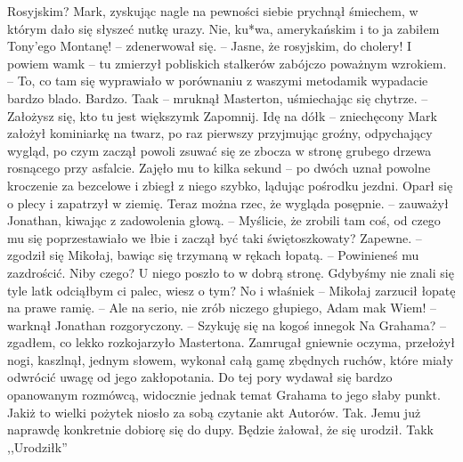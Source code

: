 \documentclass[../MAIN.tex]{subfiles}
\begin{document}
\sx Rosyjskim?
\qd
Mark, zyskując nagle na pewności siebie prychnął śmiechem, w którym dało się słyszeć nutkę urazy.
\sx Nie, ku*wa, amerykańskim i to ja zabiłem Tony’ego Montanę! -- zdenerwował się. -- Jasne, że rosyjskim, do cholery! I powiem wam\3k -- tu zmierzył pobliskich stalkerów zabójczo poważnym wzrokiem. -- To, co tam się wyprawiało w porównaniu z waszymi metodami\3k wypadacie bardzo blado. Bardzo.
\xx Taa\3k -- mruknął Masterton, uśmiechając się chytrze. -- Założysz się, kto tu jest większym\3k
\xx Zapomnij. Idę na dół\3k -- zniechęcony Mark założył kominiarkę na twarz, po raz pierwszy przyjmując groźny, odpychający wygląd, po czym zaczął powoli zsuwać się ze zbocza w stronę grubego drzewa rosnącego przy asfalcie.
\qd
Zajęło mu to kilka sekund -- po dwóch uznał powolne kroczenie za bezcelowe i zbiegł z niego szybko, lądując pośrodku jezdni. Oparł się o plecy i zapatrzył w ziemię.
\sx Teraz można rzec, że wygląda posępnie. -- zauważył Jonathan, kiwając z zadowolenia głową. -- Myślicie, że zrobili tam coś, od czego mu się poprzestawiało we łbie i zaczął być taki świętoszkowaty?
\xx Zapewne. -- zgodził się Mikołaj, bawiąc się trzymaną w rękach łopatą. -- Powinieneś mu zazdrościć.
\xx Niby czego?
\xx U niego poszło to w dobrą stronę.
\xx Gdybyśmy nie znali się tyle lat\3k odciąłbym ci palec, wiesz o tym?
\xx No i właśnie\3k -- Mikołaj zarzucił łopatę na prawe ramię. -- Ale na serio, nie zrób niczego głupiego, Adam ma\3k
\xx Wiem! -- warknął Jonathan rozgoryczony. -- Szykuję się na kogoś innego\3k
\xx Na Grahama? -- zgadłem, co lekko rozkojarzyło Mastertona.
\qd
Zamrugał gniewnie oczyma, przełożył nogi, kaszlnął, jednym słowem, wykonał całą gamę zbędnych ruchów, które miały odwrócić uwagę od jego zakłopotania. Do tej pory wydawał się bardzo opanowanym rozmówcą, widocznie jednak temat Grahama to jego słaby punkt.\\
Jakiż to wielki pożytek niosło za sobą czytanie akt Autorów.
\sx Tak. Jemu już naprawdę konkretnie dobiorę się do dupy. Będzie żałował, że się urodził. Tak\3k
\qd
,,Urodził\3k''
\end{document}
